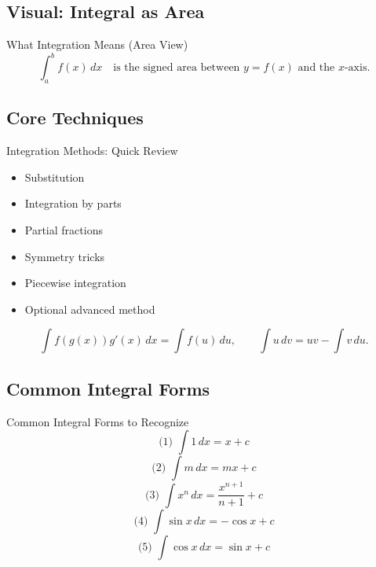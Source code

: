 \documentclass[aspectratio=169]{beamer}
\begin{document}
\subsection{Visual: Integral as Area}
\begin{frame}{What Integration Means (Area View)}
  \[
    \int_a^b f(x)\,dx
    \quad\text{is the signed area between }y=f(x)\text{ and the }x\text{-axis.}
  \]
  \vspace{2mm}
  \begin{center}
  \end{center}
\end{frame}


\subsection{Core Techniques}
\begin{frame}{Integration Methods: Quick Review}
  \begin{itemize}
    \item Substitution
    \item Integration by parts
    \item Partial fractions
    \item Symmetry tricks
    \item Piecewise integration
    \item Optional advanced method
  \end{itemize}
  \vspace{4pt}
  \[
    \int f(g(x))g'(x)\,dx=\int f(u)\,du,\qquad
    \int u\,dv=uv-\int v\,du.
  \]
\end{frame}

\subsection{Common Integral Forms}
\begin{frame}{Common Integral Forms to Recognize}
  \[
  \text{(1) }\int 1\,dx = x + c
  \]
  \[
  \text{(2) }\int m\,dx = mx + c
  \]
  \[
  \text{(3) }\int x^n\,dx = \frac{x^{n+1}}{n+1} + c
  \]
  \[
  \text{(4) }\int \sin x\,dx = -\cos x + c
  \]
  \[
  \text{(5) }\int \cos x\,dx = \sin x + c
  \]
\end{frame}
\end{document}

